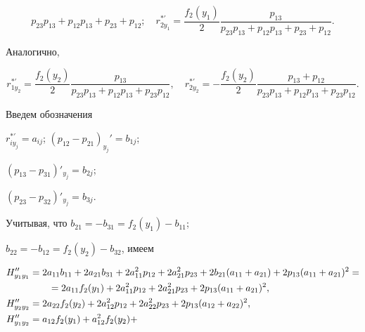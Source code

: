 \begin{pf}
\begin{equation}
{p_{23}p_{13}+p_{12}p_{13}+p_{23}+p_{12}}; \quad


r_{2 y_1}^{\ast'}=\frac{f_2(y_1)}{2}\frac{p_{13}}


{p_{23}p_{13}+p_{12}p_{13}+p_{23}+p_{12}}.


\end{equation}


Аналогично,


\begin{equation}


r_{1 y_2}^{\ast'}=\frac{f_2(y_2)}{2}\frac{p_{13}}


{p_{23}p_{13}+p_{12}p_{13}+p_{23}p_{12}}, \quad


r_{2 y_2}^{\ast'}=-\frac{f_2(y_2)}{2} \frac{p_{13}+p_{12}}


{p_{23}p_{13}+p_{12}p_{13}+p_{23}p_{12}}.\tag{4.2$'$}


\end{equation}





Введем обозначения


$r_{i y_j}^{\ast'}=a_{ij}$; $(p_{12}-p_{21})_{y_j}'=b_{1j}$;


$(p_{13}-p_{31})'_{y_j}=b_{2j}$;


$(p_{23}-p_{32})'_{y_j}=b_{3j}$.


Учитывая, что $b_{21}=-b_{31}=f_2(y_1)-b_{11}$;


$b_{22}=-b_{12}=f_2(y_2)-b_{32}$, имеем


\begin{align}


H''_{y_1y_1}&=2a_{11}b_{11}+2a_{21}b_{31}+2a_{11}^2p_{12}+2


a^2_{21}p_{23}+


2b_{21}(a_{11}+a_{21})+2p_{13}(a_{11}+a_{21})^2=\notag\\


%


&\qquad=2a_{11}f_2(y_1)+2a_{11}^2p_{12}+2a_{21}^2p_{23}+


2p_{13}(a_{11}+a_{21})^2,\notag \\


%


H''_{y_2y_2}&=2a_{22}f_2(y_2)+2a_{12}^2p_{12}+2a_{22}^2p_{23}+


2p_{13}(a_{12}+a_{22})^2,\\


%


H''_{y_1y_2}&=a_{12}f_2(y_1)+a_{12}^2f_2(y_2)+



\end{align}
\end{pf}
